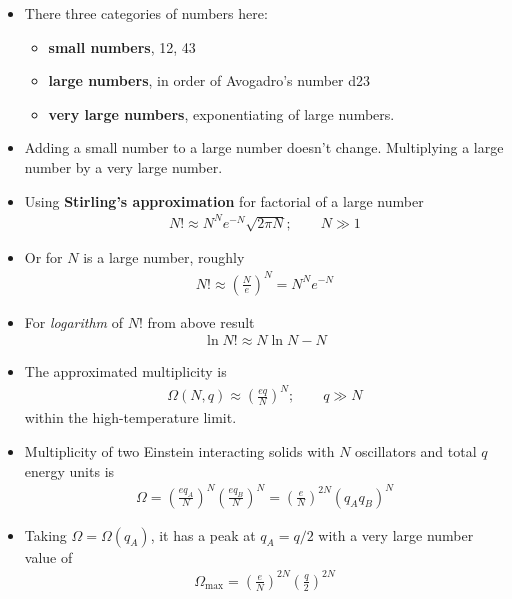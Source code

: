 \documentclass{book}
\begin{document}
\begin{itemize}
	\item There three categories of numbers here:
	      \begin{itemize}
		      \item	\textbf{small numbers}, 12, 43
		      \item	\textbf{large numbers}, in order of Avogadro's number \num{d23}
		      \item	\textbf{very large numbers}, exponentiating of large numbers.
	      \end{itemize}
	\item Adding a small number to a large number doesn't change.
	      Multiplying a large number by a very large number.
	\item Using \textbf{Stirling's approximation} for factorial of a large number
	      \begin{align}
		      \label{eq:Stirling}
		      N! \approx N^{N} e^{-N} \sqrt{2 \pi N} ; \qquad  N \gg 1
	      \end{align}
	\item Or for $N$ is a large number, roughly
	      \begin{align}
		      N! \approx \left( \frac{N}{e} \right)^N = N^N e^{-N}
	      \end{align}
	\item For \textit{logarithm} of $N!$ from above result
	      \begin{align}
		      \ln{N!} \approx N \ln{N} - N
	      \end{align}


	\item The approximated multiplicity is
	      \begin{align}
		      \label{eq:appox omega}
		      \Omega (N, q) \approx \left( \frac{eq}{N} \right)^{N}; \qquad q \gg N
	      \end{align}
	      within the high-temperature limit.
	\item Multiplicity of two Einstein interacting solids with $N$ oscillators and total $q$ energy units is
	      \begin{align}
		      \label{eq:total multipliciy}
		      \Omega = \left( \frac{eq_{A}}{N} \right)^{N}  \left( \frac{eq_B}{N} \right)^{N}
		      = \left( \frac{e}{N} \right)^{2N} (q_A q_B)^N
	      \end{align}
	\item Taking $\Omega = \Omega(q_A)$, it has a peak at $q_A= q/2$ with a very large number value of
	      \begin{align}
		      \label{eq:Omega max}
		      \Omega_{\text{max}} = \left( \frac{e}{N} \right)^{2N} \left(\frac{q}{2} \right)^{2N}
	      \end{align}


\end{itemize}
\end{document}
